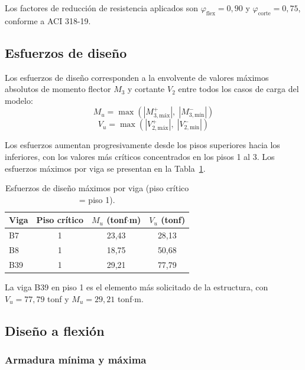 Los factores de reducción de resistencia aplicados son $\varphi_\text{flex} = 0{,}90$ y
$\varphi_\text{corte} = 0{,}75$, conforme a ACI 318-19.
 
\subsection{Esfuerzos de diseño}
 
Los esfuerzos de diseño corresponden a la envolvente de valores máximos absolutos de momento
flector $M_3$ y cortante $V_2$ entre todos los casos de carga del modelo:
\begin{equation}
    M_u = \max\!\left(|M_{3,\text{máx}}^+|,\;|M_{3,\text{mín}}^-|\right)
\end{equation}
\begin{equation}
    V_u = \max\!\left(|V_{2,\text{máx}}^+|,\;|V_{2,\text{mín}}^-|\right)
\end{equation}
 
Los esfuerzos aumentan progresivamente desde los pisos superiores hacia los inferiores, con los
valores más críticos concentrados en los pisos 1 al 3. Los esfuerzos máximos por viga se presentan
en la Tabla~\ref{tab:viga_esfuerzos}.
 
\begin{table}[H]
\centering
\caption{Esfuerzos de diseño máximos por viga (piso crítico = piso 1).}
\label{tab:viga_esfuerzos}
\begin{tabular}{lccc}
\hline
Viga & Piso crítico & $M_u$ (tonf$\cdot$m) & $V_u$ (tonf) \\
\hline
B7  & 1 & 23,43 & 28,13 \\
B8  & 1 & 18,75 & 50,68 \\
B39 & 1 & 29,21 & 77,79 \\
\hline
\end{tabular}
\end{table}
 
La viga B39 en piso 1 es el elemento más solicitado de la estructura, con $V_u = 77{,}79$ tonf y
$M_u = 29{,}21$ tonf$\cdot$m.
 
\subsection{Diseño a flexión}
 
\subsubsection{Armadura mínima y máxima}
 
